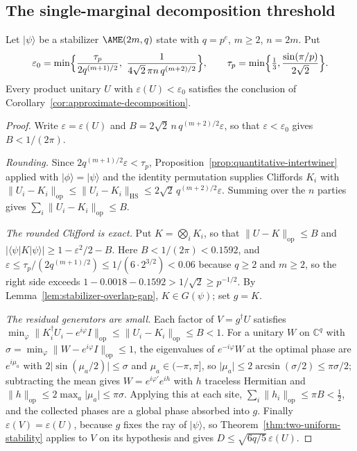 \subsection{The single-marginal decomposition threshold}

\begin{theorem}
\label{thm:explicit-threshold}
Let \(\lvert\psi\rangle\) be a stabilizer \(\AME(2m,q)\) state with
\(q=p^e\), \(m\geq2\), \(n=2m\).  Put
\[
 \varepsilon_0=\min\Bigl\{
   \frac{\tau_p}{2q^{(m+1)/2}},\
   \frac1{4\sqrt2\,\pi n\,q^{(m+2)/2}}\Bigr\},
 \qquad
 \tau_p=\min\Bigl\{\tfrac13,\frac{\sin(\pi/p)}{2\sqrt2}\Bigr\}.
\]
Every product unitary \(U\) with \(\varepsilon(U)<\varepsilon_0\) satisfies
the conclusion of Corollary~\ref{cor:approximate-decomposition}.
\end{theorem}

\begin{proof}
Write \(\varepsilon=\varepsilon(U)\) and
\(B=2\sqrt2\,n\,q^{(m+2)/2}\varepsilon\), so that
\(\varepsilon<\varepsilon_0\) gives \(B<1/(2\pi)\).

\emph{Rounding.}  Since \(2q^{(m+1)/2}\varepsilon<\tau_p\),
Proposition~\ref{prop:quantitative-intertwiner} applied with
\(\lvert\phi\rangle=\lvert\psi\rangle\) and the identity permutation
supplies Cliffords \(K_i\) with
\(\lVert U_i-K_i\rVert_{\mathrm{op}}\leq
\lVert U_i-K_i\rVert_{\mathrm{HS}}\leq2\sqrt2\,q^{(m+2)/2}\varepsilon\).
Summing over the \(n\) parties gives
\(\sum_i\lVert U_i-K_i\rVert_{\mathrm{op}}\leq B\).

\emph{The rounded Clifford is exact.}  Put \(K=\bigotimes_iK_i\), so that
\(\lVert U-K\rVert_{\mathrm{op}}\leq B\) and
\(\lvert\langle\psi\rvert K\lvert\psi\rangle\rvert\geq
1-\varepsilon^2/2-B\).  Here \(B<1/(2\pi)<0.1592\), and
\(\varepsilon\leq\tau_p/(2q^{(m+1)/2})\leq1/(6\cdot2^{3/2})<0.06\) because
\(q\geq2\) and \(m\geq2\), so the right side exceeds
\(1-0.0018-0.1592>1/\sqrt2\geq p^{-1/2}\).  By
Lemma~\ref{lem:stabilizer-overlap-gap}, \(K\in G(\psi)\); set \(g=K\).

\emph{The residual generators are small.}  Each factor of
\(V=g^\dagger U\) satisfies
\(\min_\varphi\lVert K_i^\dagger U_i-e^{i\varphi}I\rVert_{\mathrm{op}}
\leq\lVert U_i-K_i\rVert_{\mathrm{op}}\leq B<1\).  For a unitary \(W\) on
\(\mathbb C^q\) with
\(\sigma=\min_\varphi\lVert W-e^{i\varphi}I\rVert_{\mathrm{op}}\leq1\), the
eigenvalues of \(e^{-i\varphi}W\) at the optimal phase are \(e^{i\mu_a}\)
with \(2\lvert\sin(\mu_a/2)\rvert\leq\sigma\) and
\(\mu_a\in(-\pi,\pi]\), so
\(\lvert\mu_a\rvert\leq2\arcsin(\sigma/2)\leq\pi\sigma/2\); subtracting the
mean gives \(W=e^{i\varphi'}e^{ih}\) with \(h\) traceless Hermitian and
\(\lVert h\rVert_{\mathrm{op}}\leq2\max_a\lvert\mu_a\rvert\leq\pi\sigma\).
Applying this at each site,
\(\sum_i\lVert h_i\rVert_{\mathrm{op}}\leq\pi B<\frac12\), and the
collected phases are a global phase absorbed into \(g\).  Finally
\(\varepsilon(V)=\varepsilon(U)\), because \(g\) fixes the ray of
\(\lvert\psi\rangle\), so Theorem~\ref{thm:two-uniform-stability} applies
to \(V\) on its hypothesis and gives
\(D\leq\sqrt{6q/5}\,\varepsilon(U)\).
\end{proof}

